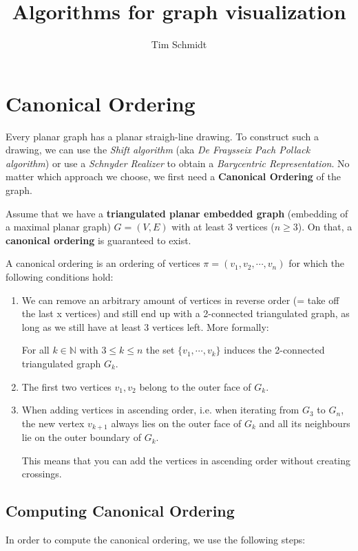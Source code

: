 \documentclass[10pt,a4paper]{article}
\author{Tim Schmidt}
\title{Algorithms for graph visualization}
\begin{document}
	{\let\newpage\relax\maketitle}
	\tableofcontents
	\newpage
	\setcounter{page}{1}

\section{Canonical Ordering}
Every planar graph has a planar straigh-line drawing.
To construct such a drawing, we can use the \textit{Shift
algorithm} (aka \textit{De Fraysseix Pach Pollack algorithm}) or use a
\textit{Schnyder Realizer} to obtain a \textit{Barycentric Representation}.
No matter which approach we choose, we first need a \textbf{Canonical Ordering}
of the graph.

Assume that we have a \textbf{triangulated planar embedded graph} (embedding
of a maximal planar graph) $G = (V,E)$ with at least 3 vertices ($n \geq 3$).
On that, a \textbf{canonical ordering} is guaranteed to exist.

A canonical ordering is an ordering of vertices $\pi = (v_1, v_2, \cdots, v_n)$
for which the following conditions hold:

\begin{enumerate}
    \item We can remove an arbitrary amount of vertices in reverse order (=
        take off the last x vertices) and still end up with a 2-connected
        triangulated graph, as long as we still have at least 3 vertices left.
        More formally:

        For all $k \in \mathbb{N}$ with $3 \leq k \leq n$ the set $\{v_1,
        \cdots, v_k\}$ induces the 2-connected triangulated graph $G_k$.

    \item The first two vertices $v_1, v_2$ belong to the outer face of $G_k$.

    \item When adding vertices in ascending order, i.e. when iterating from
        $G_3$ to $G_n$, the new vertex $v_{k+1}$ always lies on the outer face
        of $G_k$ and all its neighbours lie on the outer boundary of $G_k$.

        This means that you can add the vertices in ascending order without
        creating crossings.
\end{enumerate}

\subsection{Computing Canonical Ordering}
In order to compute the canonical ordering, we use the following steps:
\end{document}
